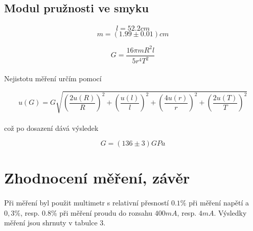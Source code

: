 \documentclass[a4paper,11pt]{article}
\begin{document}
    \subsection{Modul pružnosti ve smyku}

        \paragraph{}

        $$ l = 52.2 cm $$
        $$ m = (1.99 \pm 0.01) cm $$

        \begin{equation}
            G = \frac{16 \pi m R^{2} l}{5 r^{4} T^{2}}
        \end{equation}

        \paragraph{} Nejistotu měření určím pomocí

        \begin{equation}
            u(G) = G \sqrt{\left( \frac{2 u(R)}{R} \right)^{2} + \left( \frac{u(l)}{l} \right)^{2} + \left( \frac{4 u(r)}{r} \right)^{2} 
                + \left( \frac{2 u(T)}{T} \right)^{2}}
        \end{equation}

        \paragraph{} což po dosazení dává výsledek

        $$G = (136 \pm 3) GPa$$

    \section{Zhodnocení měření, závěr}

    \paragraph{} Při měření byl použit multimetr s relativní přesností $0.1\%$ při měření napětí
        a $0,3\%$, resp. $0.8\%$ při měření proudu do rozsahu $400 mA$, resp. $4 mA$. Výsledky 
        měření jsou shrnuty v tabulce 3.
\end{document}
